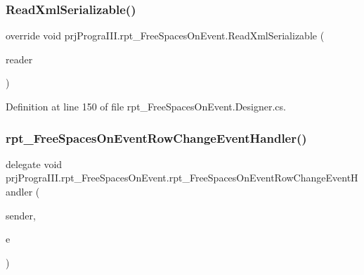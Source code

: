 \subsubsection{\texorpdfstring{Read\+Xml\+Serializable()}{ReadXmlSerializable()}}
{\footnotesize\ttfamily override void prj\+Progra\+I\+I\+I.\+rpt\+\_\+\+Free\+Spaces\+On\+Event.\+Read\+Xml\+Serializable (\begin{DoxyParamCaption}\item[{global\+::\+System.\+Xml.\+Xml\+Reader}]{reader }\end{DoxyParamCaption})\hspace{0.3cm}{\ttfamily [protected]}}



Definition at line 150 of file rpt\+\_\+\+Free\+Spaces\+On\+Event.\+Designer.\+cs.

\hypertarget{classprj_progra_i_i_i_1_1rpt___free_spaces_on_event_a19ccb59e3a6fc2f077280510cfdf1d21}{}\label{classprj_progra_i_i_i_1_1rpt___free_spaces_on_event_a19ccb59e3a6fc2f077280510cfdf1d21} 
\subsubsection{\texorpdfstring{rpt\+\_\+\+Free\+Spaces\+On\+Event\+Row\+Change\+Event\+Handler()}{rpt\_FreeSpacesOnEventRowChangeEventHandler()}}
{\footnotesize\ttfamily delegate void prj\+Progra\+I\+I\+I.\+rpt\+\_\+\+Free\+Spaces\+On\+Event.\+rpt\+\_\+\+Free\+Spaces\+On\+Event\+Row\+Change\+Event\+Handler (\begin{DoxyParamCaption}\item[{object}]{sender,  }\item[{\hyperlink{classprj_progra_i_i_i_1_1rpt___free_spaces_on_event_1_1rpt___free_spaces_on_event_row_change_event}{rpt\+\_\+\+Free\+Spaces\+On\+Event\+Row\+Change\+Event}}]{e }\end{DoxyParamCaption})}

